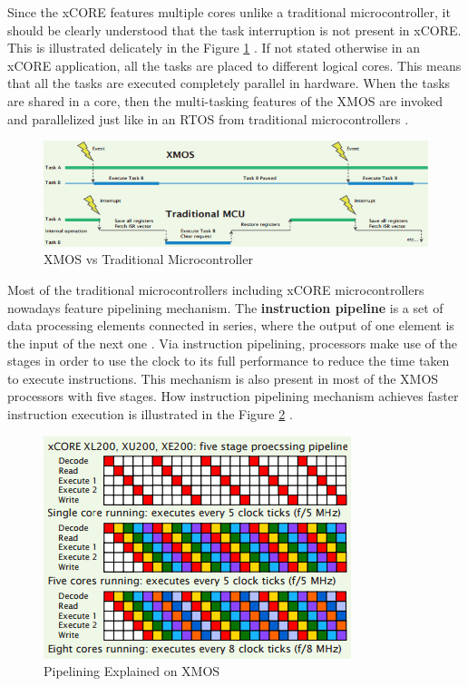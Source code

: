 Since the xCORE features multiple cores unlike a traditional microcontroller, it should be clearly understood that the task interruption is not present in xCORE. This is illustrated delicately in the Figure \ref{fig:xmosvstraditional} \cite{xmosflyer}. If not stated otherwise in an xCORE application, all the tasks are placed to different logical cores. This means that all the tasks are executed completely parallel in hardware. When the tasks are shared in a core, then the multi-tasking features of the XMOS are invoked and parallelized just like in an RTOS from traditional microcontrollers \cite{xmosflyer}.
\begin{figure}[!ht]
	\centering
	\captionsetup{justification=centering}
	\includegraphics[width=\textwidth]{content/images/xmosvstraditional.png}
	\caption{XMOS vs Traditional Microcontroller \cite{xmosflyer}}
	\label{fig:xmosvstraditional}
\end{figure}

Most of the traditional microcontrollers including xCORE microcontrollers nowadays feature pipelining mechanism. The \textbf{instruction pipeline} is a set of data processing elements connected in series, where the output of one element is the input of the next one \cite{pipelinebook}. Via instruction pipelining, processors make use of the stages in order to use the clock to its full performance to reduce the time taken to execute instructions. This mechanism is also present in most of the XMOS processors with five stages. How instruction pipelining mechanism achieves faster instruction execution is illustrated in the Figure \ref{fig:pipeline} \cite{xmosflyer}.
\begin{figure}[!ht]
	\centering
	\captionsetup{justification=centering}
	\includegraphics[scale=0.9]{content/images/pipeline.png}
	\caption{Pipelining Explained on XMOS \cite{xmosflyer}}
	\label{fig:pipeline}
\end{figure}

